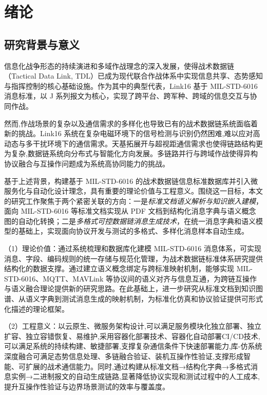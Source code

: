 \chapter{绪论}

\section{研究背景与意义}

信息化战争形态的持续演进和多域作战理念的深入发展，使得战术数据链（Tactical Data Link, TDL）已成为现代联合作战体系中实现信息共享、态势感知与指挥控制的核心基础设施\cite{NDIA_PMW101_2024,NDIA_PMW101_2022}。作为其中的典型代表，{Link16} 基于 MIL-STD-6016 消息标准，以 J 系列报文为核心，实现了跨平台、跨军种、跨域的信息交互与协同作战\cite{DOTE_2022_MIDS_LVT,NAVAIR_MIDS_Overview}。

然而,作战场景的复杂以及通信需求的多样化也导致已有的战术数据链系统面临着新的挑战。{Link16} 系统在复杂电磁环境下的信号检测与识别仍然困难,难以应对高动态与多干扰环境下的通信需求\cite{AviationWeek_SDA_LEO_2024,SDA_Signal_Detection_2023}。天基拓展开与超视距通信需求也使得链路结构更为复杂,数据链系统向分布式与智能化方向发展\cite{MIL_STD_6016_Active_2024,L3Harris_MIDS_JTRS_2021}。多链路并行与跨域作战使得异构协议融合与互操作问题成为系统高协同能力的挑战。

基于上述背景，构建基于 MIL-STD-6016 的战术数据链信息标准数据库并引入微服务化与自动化设计理念，具有重要的理论价值与工程意义。围绕这一目标，本文的研究工作聚焦于两个紧密关联的方向：一是\emph{标准文档语义解析与知识嵌入建模}，面向 MIL-STD-6016 等标准文档实现从 PDF 文档到结构化消息字典与语义概念图的自动化转换；二是\emph{多格式可控数据链消息生成技术}，在统一消息字典和语义模型的基础上，实现面向协议开发与测试的多格式、多样化消息样本自动生成。

（1）理论价值：通过系统梳理和数据库化建模 MIL-STD-6016 消息体系，可实现消息、字段、编码规则的统一存储与规范化管理，为战术数据链标准体系研究提供结构化的数据支撑。通过建立语义概念绑定与跨标准映射机制，能够实现 MIL-STD-6016、MQTT、MAVLink 等协议间的语义对齐与信息互通，为跨链互操作与语义融合理论提供新的研究思路。在此基础上，进一步研究从标准文档到知识图谱、从语义字典到测试消息生成的映射机制，为标准化仿真和协议验证提供可形式化描述的理论框架。

（2）工程意义：以云原生、微服务架构设计,可以满足服务模块化独立部署、独立扩容、独立容错恢复、易维护,采用容器化部署技术、容器化自动部署CI/CD技术,可以满足系统的持续构建、敏捷部署,支撑复杂通信条件下快速部署能力,库-仿系统深度融合可满足态势信息处理、多链融合验证、装机互操作性验证,支撑形成智能、可扩展的战术通信能力。同时,通过构建从标准文档→结构化字典→多格式消息实例→二进制报文的自动生成链路,显著降低协议实现和测试过程中的人工成本,提升互操作性验证与边界场景测试的效率与覆盖度。

